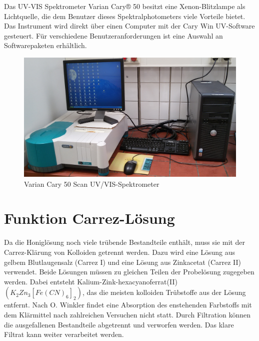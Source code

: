 Das UV-VIS Spektrometer Varian Cary® 50 besitzt eine Xenon-Blitzlampe als Lichtquelle, die dem Benutzer dieses
Spektralphotometers viele Vorteile bietet. Das Instrument wird direkt über einen Computer mit
der Cary Win UV-Software gesteuert. Für verschiedene Benutzeranforderungen ist eine Auswahl
an Softwarepaketen erhältlich.
\begin{figure}[htbp]
	\centering
		\includegraphics[width=1.00\textwidth]{../Bilder/20150504_140611.jpg}
	\caption{Varian Cary 50 Scan UV/VIS-Spektrometer }
	\label{fig:Spektrometer}
\end{figure}

\section{Funktion Carrez-Lösung}
Da die Honiglösung noch viele trübende Bestandteile enthält, muss sie mit der Carrez-Klärung von Kolloiden getrennt werden. Dazu wird eine Lösung aus gelbem Blutlaugensalz (Carrez I) und eine Lösung aus Zinkacetat (Carrez II) verwendet. Beide Lösungen müssen zu gleichen Teilen der Probelösung zugegeben werden. Dabei entsteht Kalium-Zink-hexacyanoferrat(II) $(K_{2}Zn_{3}[Fe(CN)_{6}]_{2})$, das die meisten kolloiden Trübstoffe aus der Lösung entfernt. Nach O. Winkler findet eine Absorption des enstehenden Farbstoffs mit dem Klärmittel nach zahlreichen Versuchen nicht statt. Durch Filtration können die ausgefallenen Bestandteile abgetrennt und verworfen werden. Das klare Filtrat kann weiter verarbeitet werden.~\cite{Winkler}


